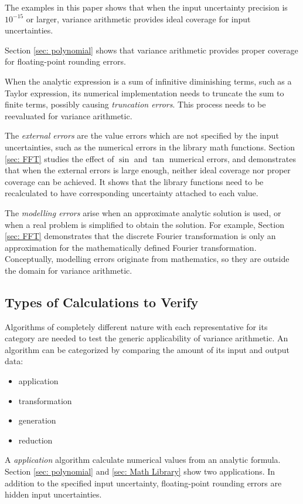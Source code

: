 \documentclass[twoside]{article}
\numberwithin{equation}{section}
\begin{document}
The examples in this paper shows that when the input uncertainty precision is $10^{-15}$ or larger, variance arithmetic provides ideal coverage for input uncertainties.

Section \ref{sec: polynomial} shows that variance arithmetic provides proper coverage for floating-point rounding errors.

When the analytic expression is a sum of infinitive diminishing terms, such as a Taylor expression, its numerical implementation needs to truncate the sum to finite terms, possibly causing \emph{truncation errors}.
This process needs to be reevaluated for variance arithmetic. 

The \emph{external errors} are the value errors which are not specified by the input uncertainties, such as the numerical errors in the library math functions.
Section \ref{sec: FFT} studies the effect of $\sin$ and $\tan$ numerical errors, and demonstrates that when the external errors is large enough, neither ideal coverage nor proper coverage can be achieved.
It shows that the library functions need to be recalculated to have corresponding uncertainty attached to each value.

The \emph{modelling errors} arise when an approximate analytic solution is used, or when a real problem is simplified to obtain the solution.  
For example, Section \ref{sec: FFT} demonstrates that the discrete Fourier transformation is only an approximation for the mathematically defined Fourier transformation.  
Conceptually, modelling errors originate from mathematics, so they are outside the domain for variance arithmetic.


\subsection{Types of Calculations to Verify \cite{Prev_Precision_Arithmetic}}

Algorithms of completely different nature with each representative for its category are needed to test the generic applicability of variance arithmetic.  
An algorithm can be categorized by comparing the amount of its input and output data:
\begin{itemize}
\item application
\item transformation
\item generation
\item reduction
\end{itemize}

A \emph{application} algorithm calculate numerical values from an analytic formula. 
Section \ref{sec: polynomial} and \ref{sec: Math Library} show two applications.
In addition to the specified input uncertainty, floating-point rounding errors are hidden input uncertainties.
\end{document}

